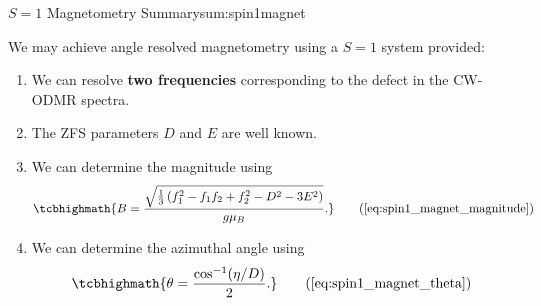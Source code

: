 \begin{summary}{$S=1$ Magnetometry Summary}{sum:spin1magnet}

	We may achieve angle resolved magnetometry using a $S=1$ system provided:
	\begin{enumerate}
        \item We can resolve \textbf{two frequencies} corresponding to the defect in the CW-ODMR spectra.
		\item The ZFS parameters $D$ and $E$ are well known.

		\item We can determine the magnitude using
		      \begin{equation}
			      \tcbhighmath{B = \frac{\sqrt{\frac{1}{3} \left(f_1^2 - f_1 f_2 + f_2^2 -D^2 -3E^2\right)}}{g \mu_B}.}
			      \tag{\ref{eq:spin1_magnet_magnitude}}
		      \end{equation}
		\item We can determine the azimuthal angle using
		      \begin{equation}
			      \tcbhighmath{
				      \theta = \frac{\cos^{-1} (\eta/D)}{2}.
			      }
			      \tag{\ref{eq:spin1_magnet_theta}}
		      \end{equation}
	\end{enumerate}


\end{summary}
